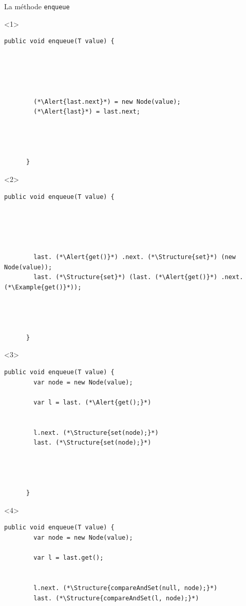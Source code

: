 
\begingroup

\begin{frame}[fragile]{La méthode \lstinline{enqueue}}

  \vspace{-20mm}
  \begin{onlyenv}<1>
    \begin{lstlisting}[gobble=6]
      public void enqueue(T value) {





        (*\Alert{last.next}*) = new Node(value);
        (*\Alert{last}*) = last.next;




      }
    \end{lstlisting}
  \end{onlyenv}
  \begin{onlyenv}<2>
    \begin{lstlisting}[gobble=6]
      public void enqueue(T value) {





        last. (*\Alert{get()}*) .next. (*\Structure{set}*) (new Node(value));
        last. (*\Structure{set}*) (last. (*\Alert{get()}*) .next. (*\Example{get()}*));




      }
    \end{lstlisting}
  \end{onlyenv}
  \begin{onlyenv}<3>
    \begin{lstlisting}[gobble=6]
      public void enqueue(T value) {
        var node = new Node(value);
        
        var l = last. (*\Alert{get();}*)


        l.next. (*\Structure{set(node);}*)
        last. (*\Structure{set(node);}*)




      }
    \end{lstlisting}
  \end{onlyenv}
  \begin{onlyenv}<4>
    \begin{lstlisting}[gobble=6]
      public void enqueue(T value) {
        var node = new Node(value);
        
        var l = last.get();


        l.next. (*\Structure{compareAndSet(null, node);}*)
        last. (*\Structure{compareAndSet(l, node);}*)





\end{lstlisting}
\end{onlyenv}
\end{frame}

